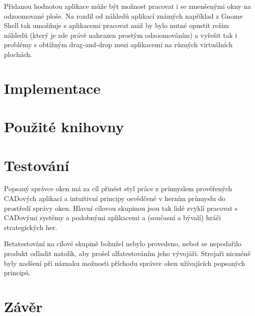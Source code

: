 \documentclass[12pt,a4paper,titlepage,final]{article}
\begin{document}
Přidanou hodnotou aplikace může být možnost pracovat i se zmenšenými okny na odzoomované ploše.
Na rozdíl od náhledů aplikací známých například z Gnome Shell tak umožňuje s aplikacemi pracovat aniž by bylo nutné opustit režim náhledů (který je zde právě nahrazen prostým odzoomováním) a vyřešit tak i problémy s obtížným drag-and-drop mezi aplikacemi na různých virtuálních plochách.

\section{Implementace}

\section{Použité knihovny}

\section{Testování}

Popsaný správce oken má za cíl přinést styl práce z průmyslem prověřených CADových aplikací a intuitivní principy osvědčené v herním průmyslu do prostředí správy oken.
Hlavní cílovou skupinou jsou tak lidé zvyklí pracovat s CADovými systémy a podobnými aplikacemi a (současní a bývalí) hráči strategických her.

Betatestování na cílové skupině bohužel nebylo provedeno, neboť se nepodařilo produkt odladit natolik,
aby prošel alfatestováním jeho vývojáři. Strojaři nicméně byly nadšení při náznaku možnosti příchodu správce
oken užívajících popsaných principů.

\section{Závěr} \label{zaver}
\end{document}
